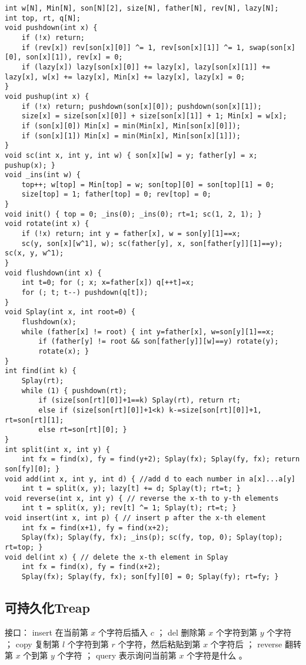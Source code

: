 \documentclass[landscape,a4paper]{article}
\begin{document}
\begin{lstlisting}
int w[N], Min[N], son[N][2], size[N], father[N], rev[N], lazy[N];
int top, rt, q[N];
void pushdown(int x) {
	if (!x) return;
	if (rev[x]) rev[son[x][0]] ^= 1, rev[son[x][1]] ^= 1, swap(son[x][0], son[x][1]), rev[x] = 0;
	if (lazy[x]) lazy[son[x][0]] += lazy[x], lazy[son[x][1]] += lazy[x], w[x] += lazy[x], Min[x] += lazy[x], lazy[x] = 0;
}
void pushup(int x) {
	if (!x) return; pushdown(son[x][0]); pushdown(son[x][1]);
	size[x] = size[son[x][0]] + size[son[x][1]] + 1; Min[x] = w[x];
	if (son[x][0]) Min[x] = min(Min[x], Min[son[x][0]]);
	if (son[x][1]) Min[x] = min(Min[x], Min[son[x][1]]);
}
void sc(int x, int y, int w) { son[x][w] = y; father[y] = x; pushup(x); }
void _ins(int w) {
	top++; w[top] = Min[top] = w; son[top][0] = son[top][1] = 0;
	size[top] = 1; father[top] = 0; rev[top] = 0;
}
void init() { top = 0; _ins(0); _ins(0); rt=1; sc(1, 2, 1); }
void rotate(int x) {
	if (!x) return; int y = father[x], w = son[y][1]==x;
	sc(y, son[x][w^1], w); sc(father[y], x, son[father[y]][1]==y); sc(x, y, w^1);
}
void flushdown(int x) {
	int t=0; for (; x; x=father[x]) q[++t]=x;
	for (; t; t--) pushdown(q[t]);
}
void Splay(int x, int root=0) {
	flushdown(x);
	while (father[x] != root) { int y=father[x], w=son[y][1]==x;
		if (father[y] != root && son[father[y]][w]==y) rotate(y);
		rotate(x); }
}
int find(int k) {
	Splay(rt);
	while (1) {	pushdown(rt);
		if (size[son[rt][0]]+1==k) Splay(rt), return rt;
		else if (size[son[rt][0]]+1<k) k-=size[son[rt][0]]+1, rt=son[rt][1];
		else rt=son[rt][0]; }
}
int split(int x, int y) {
	int fx = find(x), fy = find(y+2); Splay(fx); Splay(fy, fx); return son[fy][0]; }
void add(int x, int y, int d) { //add d to each number in a[x]...a[y]
	int t = split(x, y); lazy[t] += d; Splay(t); rt=t; }
void reverse(int x, int y) { // reverse the x-th to y-th elements
	int t = split(x, y); rev[t] ^= 1; Splay(t); rt=t; }
void insert(int x, int p) { // insert p after the x-th element
	int fx = find(x+1), fy = find(x+2);
	Splay(fx); Splay(fy, fx); _ins(p); sc(fy, top, 0); Splay(top); rt=top; }
void del(int x) { // delete the x-th element in Splay
	int fx = find(x), fy = find(x+2);
	Splay(fx); Splay(fy, fx); son[fy][0] = 0; Splay(fy); rt=fy; }
\end{lstlisting}

\subsection{可持久化Treap}
接口： 
 insert 在当前第 $x$ 个字符后插入 $c$ ；
 del 删除第 $x$ 个字符到第 $y$ 个字符 ；
 copy 复制第 $l$ 个字符到第 $r$ 个字符，然后粘贴到第 $x$ 个字符后 ；
 reverse 翻转第 $x$ 个到第 $y$ 个字符 ；
 query 表示询问当前第 $x$ 个字符是什么 。
\end{document}

